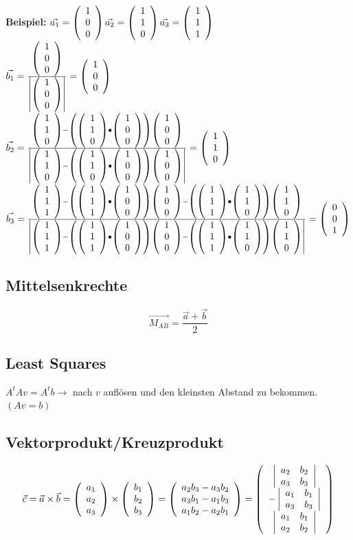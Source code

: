 	\textbf{Beispiel:} $\vec{a_1}=\vektor{1}{0}{0}
						\vec{a_2}=\vektor{1}{1}{0}
						\vec{a_3}=\vektor{1}{1}{1}$ \\
						
						$\vec{b_1}=\frac{\vektor{1}{0}{0}}{\left|\vektor{1}{0}{0}\right|}=\vektor{1}{0}{0}$ \\
						$\vec{b_2}=\frac{\vektor{1}{1}{0}-\left(\vektor{1}{1}{0}\bullet\vektor{1}{0}{0}\right)\vektor{1}{0}{0}}{\left|\vektor{1}{1}{0}-\left(\vektor{1}{1}{0}\bullet\vektor{1}{0}{0}\right)\vektor{1}{0}{0}\right|}=\vektor{1}{1}{0}$\\
						$\vec{b_3}=\frac{\vektor{1}{1}{1}-\left(\vektor{1}{1}{1}\bullet\vektor{1}{0}{0}\right)\vektor{1}{0}{0}-\left(\vektor{1}{1}{1}\bullet\vektor{1}{1}{0}\right)\vektor{1}{1}{0}}{\left|\vektor{1}{1}{1}-\left(\vektor{1}{1}{1}\bullet\vektor{1}{0}{0}\right)\vektor{1}{0}{0}-\left(\vektor{1}{1}{1}\bullet\vektor{1}{1}{0}\right)\vektor{1}{1}{0}\right|}=\vektor{0}{0}{1}$

\subsection{Mittelsenkrechte}
	\begin{equation*}
		\vec{M_{AB}} = \frac{\vec{a} + \vec{b}}{2}
	\end{equation*}

\subsection{Least Squares}
	$A^tAv = A^tb \longrightarrow$ nach $v$ auflösen und den kleinsten Abstand zu bekommen. \qquad $(Av = b)$
		
\subsection{Vektorprodukt/Kreuzprodukt}
	\begin{equation*}
		\vec{c} = \vec{a} \times \vec{b} = \vektor{a_1}{a_2}{a_3} \times \vektor{b_1}{b_2}{b_3} = \left(\begin{array}{c}
			a_2b_3 - a_3b_2\\
			a_3b_1 - a_1b_3\\
			a_1b_2 - a_2b_1
		\end{array}\right)
		=\left(\begin{array}{c}
			\left|\begin{array}{cc}
				a_2 & b_2 \\
				a_3 & b_3 \end{array}\right|\\
			-\left|\begin{array}{cc}
				a_1 & b_1 \\
				a_3 & b_3 \end{array}\right|\\
			\left|\begin{array}{cc}
				a_1 & b_1 \\
				a_2 & b_2 \end{array}\right|
		\end{array}\right)
	\end{equation*}

